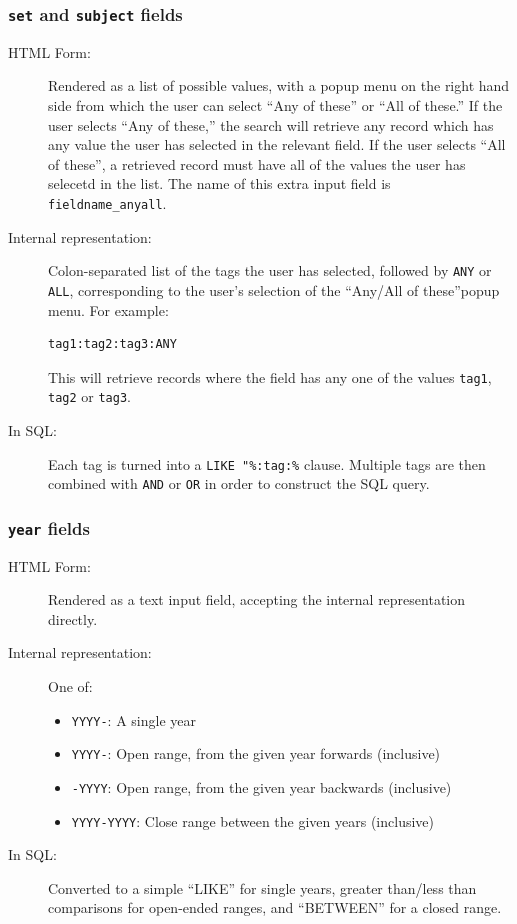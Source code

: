 \subsubsection{{\tt set} and {\tt subject} fields}

\begin{description}
\item[HTML Form:] Rendered as a list of possible values, with a popup menu on the right hand side from which the user can select ``Any of these'' or ``All of these.'' If the user selects ``Any of these,'' the search will retrieve any record which has any value the user has selected in the relevant field. If the user selects ``All of these'', a retrieved record must have all of the values the user has selecetd in the list.  The name of this extra input field is {\tt fieldname\_anyall}.

\item[Internal representation:] Colon-separated list of the tags the user has selected, followed by {\tt ANY} or {\tt ALL}, corresponding to the user's selection of the ``Any/All of these''popup menu. For example:

\begin{verbatim}
tag1:tag2:tag3:ANY
\end{verbatim}

This will retrieve records where the field has any one of the values {\tt tag1}, {\tt tag2} or {\tt tag3}.

\item[In SQL:] Each tag is turned into a {\tt LIKE "\%:tag:\%} clause. Multiple tags are then combined with {\tt AND} or {\tt OR}  in order to construct the SQL query.
\end{description}


\subsubsection{{\tt year} fields}

\begin{description}
\item[HTML Form:] Rendered as a text input field, accepting the internal representation directly.

\item[Internal representation:] One of:
\begin{itemize}
\item {\tt YYYY-}: A single year
\item {\tt YYYY-}: Open range, from the given year forwards (inclusive)
\item {\tt -YYYY}: Open range, from the given year backwards (inclusive)
\item {\tt YYYY-YYYY}: Close range between the given years (inclusive)
\end{itemize}

\item[In SQL:] Converted to a simple ``LIKE'' for single years, greater than/less than comparisons for open-ended ranges, and ``BETWEEN'' for a closed range.
\end{description}



